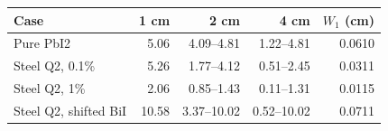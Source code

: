 \begin{tabular}{lrrrr}
\toprule
Case & 1 cm & 2 cm & 4 cm & $W_1$ (cm) \\
\midrule
Pure PbI2 & 5.06 & 4.09--4.81 & 1.22--4.81 & 0.0610 \\
Steel Q2, 0.1\% & 5.26 & 1.77--4.12 & 0.51--2.45 & 0.0311 \\
Steel Q2, 1\% & 2.06 & 0.85--1.43 & 0.11--1.31 & 0.0115 \\
Steel Q2, shifted BiI & 10.58 & 3.37--10.02 & 0.52--10.02 & 0.0711 \\
\bottomrule
\end{tabular}

